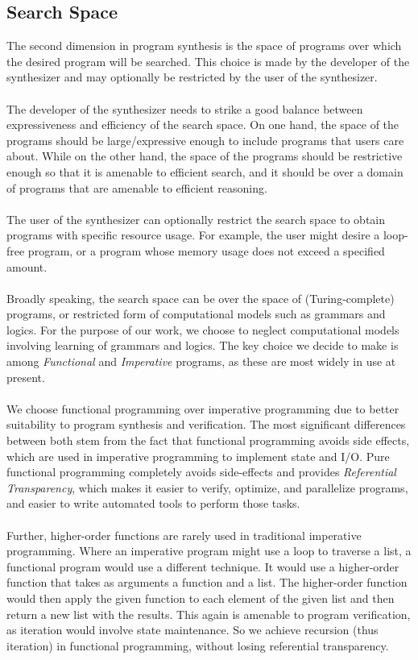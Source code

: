 \subsection{Search Space}
The second dimension in program synthesis is the space of programs over which the desired program will be searched. This choice is made by the developer of the synthesizer and may optionally be restricted by the user of the synthesizer. \\\\
The developer of the synthesizer needs to strike a good balance between expressiveness and efficiency of the search space. On one hand, the space of the programs should be large/expressive enough to include programs that users care about. While on the other hand, the space of the programs should be restrictive enough so that it is amenable to efficient search, and it should be over a domain of programs that are amenable to efficient reasoning. \\\\
The user of the synthesizer can optionally restrict the search space to obtain programs with specific resource usage. For example, the user might desire a loop-free program, or a program whose memory usage does not exceed a specified amount. \\\\
Broadly speaking, the search space can be over the space of (Turing-complete) programs, or restricted form of computational models such as grammars and logics. For the purpose of our work, we choose to neglect computational models involving learning of grammars and logics. The key choice we decide to make is among \emph{Functional} and \emph{Imperative} programs, as these are most widely in use at present. \\\\
We choose functional programming over imperative programming due to better suitability to program synthesis and verification. The most significant differences between both stem from the fact that functional programming avoids side effects, which are used in imperative programming to implement state and I/O. Pure functional programming completely avoids side-effects and provides \emph{Referential Transparency}, which makes it easier to verify, optimize, and parallelize programs, and easier to write automated tools to perform those tasks. \\\\
Further, higher-order functions are rarely used in traditional imperative programming. Where an imperative program might use a loop to traverse a list, a functional program would use a different technique. It would use a higher-order function that takes as arguments a function and a list. The higher-order function would then apply the given function to each element of the given list and then return a new list with the results. This again is amenable to program verification, as iteration would involve state maintenance. So we achieve recursion (thus iteration) in functional programming, without losing referential transparency.